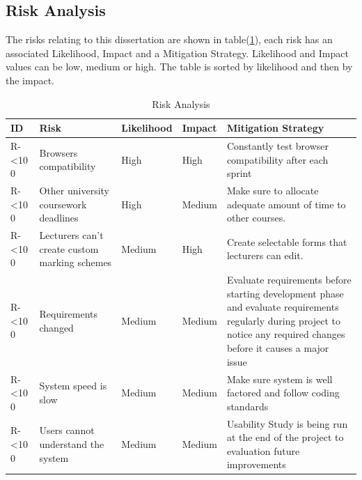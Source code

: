 \documentclass[12pt]{article}  %
\newcommand{\rid}[1]{\centering #1-\ifnum\value{requirement}<10 0\fi\arabic{requirement} \stepcounter{requirement}}
\begin{document}

\subsection{Risk Analysis}

The risks relating to this dissertation are shown in table(\ref{table:risks}), each risk has an associated Likelihood, Impact and a Mitigation Strategy. Likelihood and Impact values can be low, medium or high. The table is sorted by likelihood and then by the impact.

\begin{spacing}{1.5}
\begin{longtable}{|p{}|p{}|p{}|p{}|p{}|}
\caption{Risk Analysis} \label{table:risks} \\
\hline

\textbf{ID} & \textbf{Risk} & \textbf{Likelihood} & \textbf{Impact } & \textbf{Mitigation Strategy}\\
\hline

\rid{R} & Browsers compatibility & High & High & Constantly test browser compatibility after each sprint\\ \hline

\rid{R} & Other university coursework deadlines & High & Medium & Make sure to allocate adequate amount of time to other courses.\\ \hline



\rid{R} & Lecturers can’t create custom marking schemes & Medium & High & Create selectable forms that lecturers can edit.\\ \hline

\rid{R} & Requirements changed & Medium & Medium & Evaluate requirements before starting development phase and evaluate requirements regularly during project to notice any required changes before it causes a major issue \\ \hline

\rid{R} & System speed is slow & Medium & Medium & Make sure system is well factored and follow coding standards \\ \hline

\rid{R} & Users cannot understand the system & Medium & Medium & Usability Study is being run at the end of the project to evaluation future improvements\\ \hline


\end{longtable}
\end{spacing}
\end{document}
